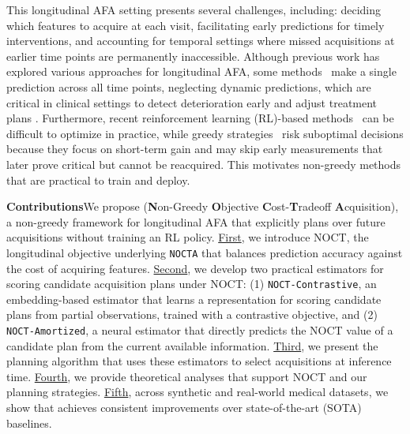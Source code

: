 This longitudinal AFA setting presents several challenges, including: deciding which features to acquire at each visit, facilitating early predictions for timely interventions, and accounting for temporal settings where missed acquisitions at earlier time points are permanently inaccessible. Although previous work has explored various approaches for longitudinal AFA, some methods~\citep{kossen2022active} make a single prediction across all time points, neglecting dynamic predictions, which are critical in clinical settings to detect deterioration early and adjust treatment plans \citep{qin2024risk}. Furthermore, recent reinforcement learning (RL)-based methods~\citep{qin2024risk,nguyen2024active} can be difficult to optimize in practice, while greedy strategies~\citep{gadgil2023estimating} risk suboptimal decisions because they focus on short-term gain and may skip early measurements that later prove critical but cannot be reacquired. This motivates non-greedy methods that are practical to train and deploy. 

\textbf{Contributions}\quad We propose \texttt{\OurMethod} (\textbf{N}on-Greedy \textbf{O}bjective \textbf{C}ost-\textbf{T}radeoff \textbf{A}cquisition), a non-greedy framework for longitudinal AFA that explicitly plans over future acquisitions without training an RL policy. \uline{First}, we introduce NOCT, the longitudinal objective underlying \texttt{NOCTA} that balances prediction accuracy against the cost of acquiring features. \uline{Second}, we develop two practical estimators for scoring candidate acquisition plans under NOCT: (1) \texttt{NOCT-Contrastive}, an embedding-based estimator that learns a representation for scoring candidate plans from partial observations, trained with a contrastive objective, and (2) \texttt{NOCT-Amortized}, a neural estimator that directly predicts the NOCT value of a candidate plan from the current available information. \uline{Third}, we present the \texttt{\OurMethod} planning algorithm that uses these estimators to select acquisitions at inference time. \uline{Fourth}, we provide theoretical analyses
that support NOCT and our planning strategies. 
\uline{Fifth}, across synthetic and real-world medical datasets, we show that \texttt{\OurMethod} achieves consistent improvements over state-of-the-art (SOTA) baselines.  %



